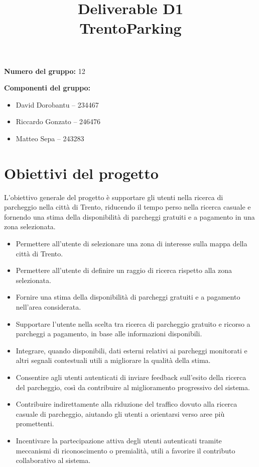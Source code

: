 \documentclass[a4paper,12pt]{article}
\title{Deliverable D1\\TrentoParking}
\author{}
\date{}
\begin{document}
\maketitle

\noindent \textbf{Numero del gruppo:} 12

\vspace{0.3cm}

\noindent \textbf{Componenti del gruppo:}
\begin{itemize}[leftmargin=1.2cm]
    \item David Dorobantu -- 234467
    \item Riccardo Gonzato -- 246476
    \item Matteo Sepa -- 243283
\end{itemize}

\section{Obiettivi del progetto}

L'obiettivo generale del progetto è supportare gli utenti nella ricerca di parcheggio nella città di Trento, riducendo il tempo perso nella ricerca casuale e fornendo una stima della disponibilità di parcheggi gratuiti e a pagamento in una zona selezionata.

\begin{itemize}[leftmargin=2.2cm]
    \item[\textbf{O1:}] Permettere all'utente di selezionare una zona di interesse sulla mappa della città di Trento.
    \item[\textbf{O2:}] Permettere all'utente di definire un raggio di ricerca rispetto alla zona selezionata.
    \item[\textbf{O3:}] Fornire una stima della disponibilità di parcheggi gratuiti e a pagamento nell'area considerata.
    \item[\textbf{O4:}] Supportare l'utente nella scelta tra ricerca di parcheggio gratuito e ricorso a parcheggi a pagamento, in base alle informazioni disponibili.
    \item[\textbf{O5:}] Integrare, quando disponibili, dati esterni relativi ai parcheggi monitorati e altri segnali contestuali utili a migliorare la qualità della stima.
    \item[\textbf{O6:}] Consentire agli utenti autenticati di inviare feedback sull'esito della ricerca del parcheggio, così da contribuire al miglioramento progressivo del sistema.
    \item[\textbf{O7:}] Contribuire indirettamente alla riduzione del traffico dovuto alla ricerca casuale di parcheggio, aiutando gli utenti a orientarsi verso aree più promettenti.
    \item[\textbf{O8:}] Incentivare la partecipazione attiva degli utenti autenticati tramite meccanismi di riconoscimento o premialità, utili a favorire il contributo collaborativo al sistema.
\end{itemize}
\end{document}
